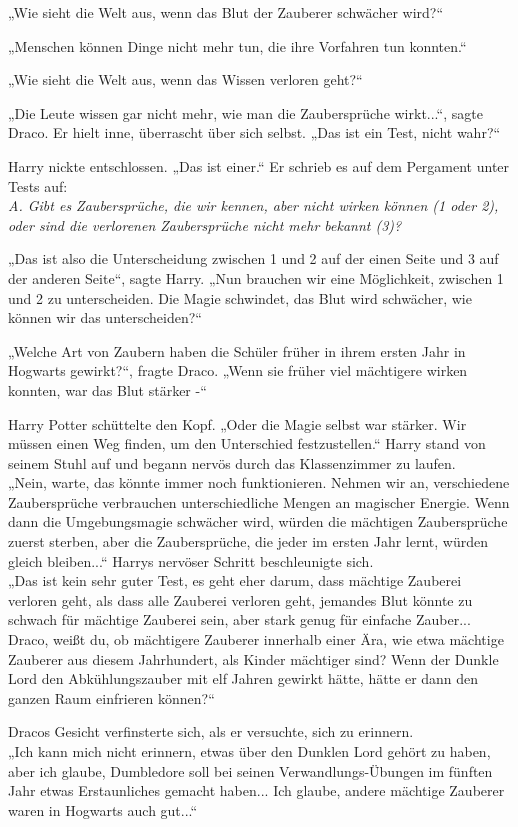 {„Wie sieht die Welt aus, wenn das Blut der Zauberer schwächer wird?“

„Menschen können Dinge nicht mehr tun, die ihre Vorfahren tun konnten.“

„Wie sieht die Welt aus, wenn das Wissen verloren geht?“

„Die Leute wissen gar nicht mehr, wie man die Zaubersprüche wirkt...“, sagte Draco. Er hielt inne, überrascht über sich selbst. „Das ist ein Test, nicht wahr?“

Harry nickte entschlossen. „Das ist einer.“ Er schrieb es auf dem Pergament unter Tests auf:\\ \emph{A. Gibt es Zaubersprüche, die wir kennen, aber nicht wirken können (1 oder 2), oder sind die verlorenen Zaubersprüche nicht mehr bekannt (3)?}

„Das ist also die Unterscheidung zwischen 1 und 2 auf der einen Seite und 3 auf der anderen Seite“, sagte Harry. „Nun brauchen wir eine Möglichkeit, zwischen 1 und 2 zu unterscheiden. Die Magie schwindet, das Blut wird schwächer, wie können wir das unterscheiden?“

„Welche Art von Zaubern haben die Schüler früher in ihrem ersten Jahr in Hogwarts gewirkt?“, fragte Draco. „Wenn sie früher viel mächtigere wirken konnten, war das Blut stärker -“

Harry Potter schüttelte den Kopf. „Oder die Magie selbst war stärker. Wir müssen einen Weg finden, um den Unterschied festzustellen.“ Harry stand von seinem Stuhl auf und begann nervös durch das Klassenzimmer zu laufen.\\ „Nein, warte, das könnte immer noch funktionieren. Nehmen wir an, verschiedene Zaubersprüche verbrauchen unterschiedliche Mengen an magischer Energie. Wenn dann die Umgebungsmagie schwächer wird, würden die mächtigen Zaubersprüche zuerst sterben, aber die Zaubersprüche, die jeder im ersten Jahr lernt, würden gleich bleiben...“ Harrys nervöser Schritt beschleunigte sich.\\ „Das ist kein sehr guter Test, es geht eher darum, dass mächtige Zauberei verloren geht, als dass alle Zauberei verloren geht, jemandes Blut könnte zu schwach für mächtige Zauberei sein, aber stark genug für einfache Zauber... Draco, weißt du, ob mächtigere Zauberer innerhalb einer Ära, wie etwa mächtige Zauberer aus diesem Jahrhundert, als Kinder mächtiger sind? Wenn der Dunkle Lord den Abkühlungszauber mit elf Jahren gewirkt hätte, hätte er dann den ganzen Raum einfrieren können?“

Dracos Gesicht verfinsterte sich, als er versuchte, sich zu erinnern.\\ „Ich kann mich nicht erinnern, etwas über den Dunklen Lord gehört zu haben, aber ich glaube, Dumbledore soll bei seinen Verwandlungs-Übungen im fünften Jahr etwas Erstaunliches gemacht haben... Ich glaube, andere mächtige Zauberer waren in Hogwarts auch gut...“

}
